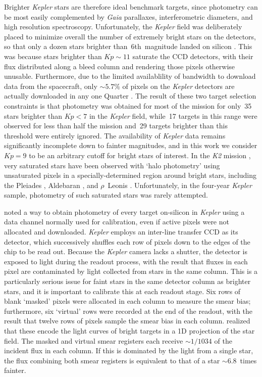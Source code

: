 \documentclass[a4paper,fleqn,usenatbib]{mnras}
\newcommand{\kepler}{\textit{Kepler}\xspace}
\newcommand{\ktwo}{\textit{K2}\xspace}
\newcommand{\gaia}{\textit{Gaia}\xspace}
\begin{document}
Brighter \kepler stars are therefore ideal benchmark targets, since photometry can be most easily complemented by \gaia parallaxes, interferometric diameters, and high resolution spectroscopy.  
Unfortunately, the \kepler field was deliberately placed to minimize overall the number of extremely bright stars on the detectors, so that only a dozen stars brighter than~6th~magnitude landed on silicon \citep{2010ApJ...713L..79K}. This was because stars brighter than $Kp \sim 11$ saturate the CCD detectors, with their flux distributed along a bleed column and rendering those pixels otherwise unusable. Furthermore, due to the limited availablility of bandwidth to download data from the spacecraft, only $\sim 5.7\%$ of pixels on the \kepler detectors are actually downloaded in any one Quarter \citep{2010ApJ...713L..87J}. The result of these two target selection constraints is that photometry was obtained for most of the mission for only~35 stars brighter than $Kp<7$ in the \kepler field, while~17 targets in this range were observed for less than half the mission and~29 targets brighter than this threshold were entirely ignored. The availability of \kepler data remains significantly incomplete down to fainter magnitudes, and in this work we consider $Kp=9$ to be an arbitrary cutoff for bright stars of interest. In the \ktwo mission \citep{k2early}, very saturated stars have been observed with `halo photometry' using unsaturated pixels in a specially-determined region around bright stars, including the Pleiades \citep{halo}, Aldebaran \citep{aldebaran}, and $\rho$~Leonis \citep{rholeo}. Unfortunately, in the four-year \kepler sample, photometry of such saturated stars was rarely attempted.

\citet{orig_smear} noted a way to obtain photometry of every target on-silicon in \kepler using a data channel normally used for calibration, even if active pixels were not allocated and downloaded. \kepler employs an inter-line transfer CCD as its detector, which successively shuffles each row of pixels down to the edges of the chip to be read out. Because the \kepler camera lacks a shutter, the detector is exposed to light during the readout process, with the result that fluxes in each pixel are contaminated by light collected from stars in the same column. This is a particularly serious issue for faint stars in the same detector column as brighter stars, and it is important to calibrate this at each readout stage. Six rows of blank `masked' pixels were allocated in each column to measure the smear bias; furthermore, six `virtual' rows were recorded at the end of the readout, with the result that twelve rows of pixels sample the smear bias in each column. \citet{orig_smear} realized that these encode the light curves of bright targets in a 1D projection of the star field. The masked and virtual smear registers each receive $\sim 1/1034$ of the incident flux in each column. If this is dominated by the light from a single star, the flux combining both smear registers is equivalent to that of a star $\sim 6.8$~times fainter. 
\end{document}
